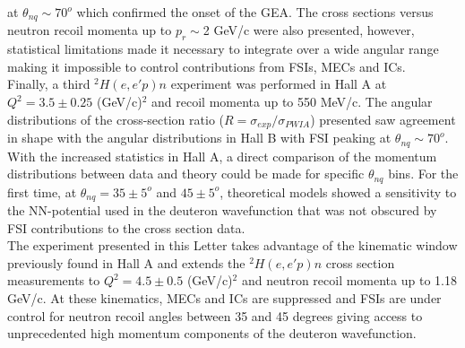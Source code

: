 at $\theta_{nq} \sim 70^{o}$ which confirmed the onset of the GEA\cite{Sargsian_2001,PhysRevC.56.1124}.
The cross sections versus neutron recoil momenta up to $p_{r}\sim$2 GeV/c were also presented, however, statistical limitations made it necessary to integrate over a wide angular range making it impossible to control
contributions from FSIs, MECs and ICs. \\
\indent Finally, a third $^{2}H(e,e'p)n$ experiment was performed in Hall A \cite{PhysRevLett.107.262501} at $Q^{2} = 3.5\pm0.25$ (GeV/c)$^{2}$ and recoil momenta up to 550 MeV/c. The angular distributions of
the cross-section ratio ($R = \sigma_{exp}/\sigma_{PWIA}$) presented saw agreement in shape with the angular distributions in Hall B\cite{PhysRevLett.98.262502} with FSI peaking at $\theta_{nq}\sim70^{o}$. With the increased statistics in Hall A, a direct comparison of the momentum distributions between data and theory could be made for specific $\theta_{nq}$ bins. For the first time, at $\theta_{nq}=35\pm5^{o}$ and $45\pm5^{o}$, theoretical models showed a sensitivity to the NN-potential used in the deuteron wavefunction that was not obscured by FSI contributions to the cross section data.\\
\indent The experiment presented in this Letter takes advantage of the kinematic window previously found in Hall A\cite{PhysRevLett.107.262501} and extends the $^{2}H(e,e'p)n$ cross section measurements
to $Q^{2}=4.5\pm0.5$ (GeV/c)$^{2}$ and neutron recoil momenta up to 1.18 GeV/c. At these kinematics, MECs and ICs are suppressed and FSIs are under control for neutron recoil angles between 35 and 45 degrees
giving access to unprecedented high momentum components of the deuteron wavefunction. \\

